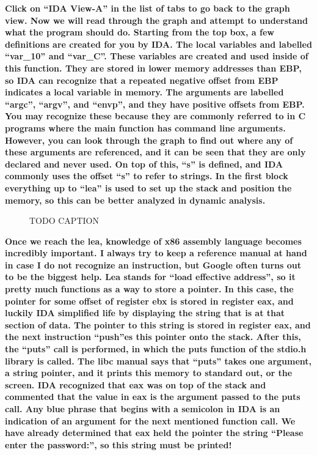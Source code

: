 \documentclass[letterpaper]{article}
\newcommand{\sitfig}[3]{
\begin{figure}[H]
\centering
\makebox[\textwidth][c]{
#2
}
\caption{#3}
\label{#1}
\end{figure}
}
\newcommand{\sitgfx}[4][scale=1.0]{
\sitfig{#3}{\texttt{[image: \#2]}}{#4}
}
\begin{document}
\textbf{Click on ``IDA View-A'' in the list of tabs to go back to the graph view. Now we will read through the graph and
attempt to understand what the program should do. Starting from the top box, a few definitions are created for you by
IDA. The local variables and labelled ``var\_10'' and ``var\_C''. These variables are created and used inside of this
function. They are stored in lower memory addresses than EBP, so IDA can recognize that a repeated negative offset from
EBP indicates a local variable in memory. The arguments are labelled ``argc'', ``argv'', and ``envp'', and they have
positive offsets from EBP. You may recognize these because they are commonly referred to in C programs where the main
function has command line arguments. However, you can look through the graph to find out where any of these arguments
are referenced, and it can be seen that they are only declared and never used. On top of this, ``s'' is defined, and
IDA commonly uses the offset ``s'' to refer to strings. In the first block everything up to ``lea'' is used to set up
the stack and position the memory, so this can be better analyzed in dynamic analysis. }  
\sitgfx[width=6.4583in,height=2.4791in]{FINALWORKINGDOCFORMERLYPRECURSOR-img047.png}{fig:unk}{TODO CAPTION}
 \textbf{Once we reach the lea, knowledge of x86 assembly language becomes incredibly important. I always try to keep a
reference manual at hand in case I do not recognize an instruction, but Google often turns out to be the biggest help.
Lea stands for ``load effective address'', so it pretty much functions as a way to store a pointer. In this case, the
pointer for some offset of register ebx is stored in register eax, and luckily IDA simplified life by displaying the
string that is at that section of data. The pointer to this string is stored in register eax, and the next instruction
``push''es this pointer onto the stack. After this, the ``puts'' call is performed, in which the puts function of the
stdio.h library is called. The libc manual says that ``puts'' takes one argument, a string pointer, and it prints this
memory to standard out, or the screen. IDA recognized that eax was on top of the stack and commented that the value in
eax is the argument passed to the puts call. Any blue phrase that begins with a semicolon in IDA is an indication of an
argument for the next mentioned function call. We have already determined that eax held the pointer the string ``Please
enter the password:'', so this string must be printed!}
\end{document}
